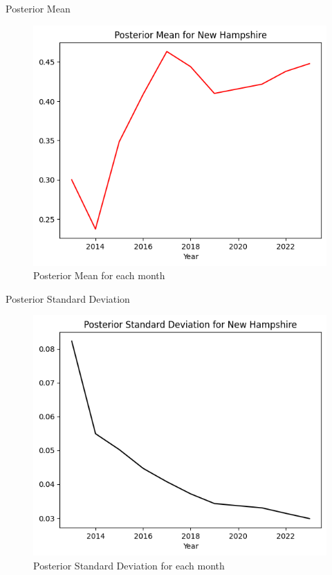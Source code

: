 \begin{frame}{Posterior Mean}
    
\begin{figure}
  \centering
  \includegraphics[width=.8\linewidth]{../Report/images/posterior-mean.png}
  \caption{Posterior Mean for each month}
\end{figure}

\end{frame}

\begin{frame}{Posterior Standard Deviation}

\begin{figure}
  \centering
  \includegraphics[width=.8\linewidth]{../Report/images/posterior-sd.png}
  \caption{Posterior Standard Deviation for each month}
\end{figure}

\end{frame}